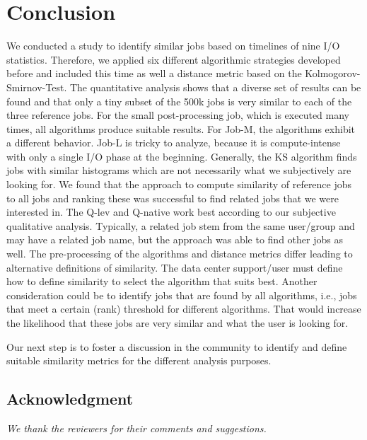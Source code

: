 \documentclass{jhps}
\begin{document}
\section{Conclusion}%
\label{sec:summary}

We conducted a study to identify similar jobs based on timelines of nine I/O statistics.
Therefore, we applied six different algorithmic strategies developed before and included this time as well a distance metric based on the Kolmogorov-Smirnov-Test.
The quantitative analysis shows that a diverse set of results can be found and that only a tiny subset of the 500k jobs is very similar to each of the three reference jobs.
For the small post-processing job, which is executed many times, all algorithms produce suitable results.
For Job-M, the algorithms exhibit a different behavior.
Job-L is tricky to analyze, because it is compute-intense with only a single I/O phase at the beginning.
Generally, the KS algorithm finds jobs with similar histograms which are not necessarily what we subjectively are looking for.
We found that the approach to compute similarity of reference jobs to all jobs and ranking these was successful to find related jobs that we were interested in.
The Q-lev and Q-native work best according to our subjective qualitative analysis.
Typically, a related job stem from the same user/group and may have a related job name, but the approach was able to find other jobs as well.
The pre-processing of the algorithms and distance metrics differ leading to alternative definitions of similarity.
The data center support/user must define how to define similarity to select the algorithm that suits best.
Another consideration could be to identify jobs that are found by all algorithms, i.e., jobs that meet a certain (rank) threshold for different algorithms.
That would increase the likelihood that these jobs are very similar and what the user is looking for.

Our next step is to foster a discussion in the community to identify and define suitable similarity metrics for the different analysis purposes.



\subsection*{Acknowledgment} %
\textit{We thank the reviewers for their comments and suggestions.}


\end{document}

